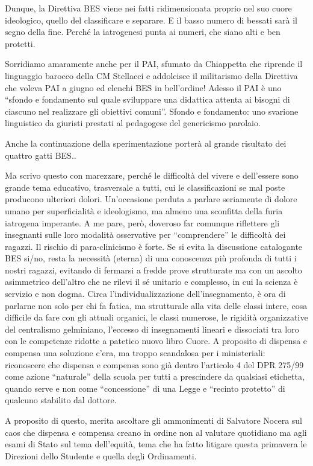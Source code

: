 Dunque, la Direttiva BES viene nei fatti ridimensionata proprio nel suo cuore ideologico, quello del  classificare e separare. E il basso numero di bessati sarà il segno della fine. Perché la iatrogenesi punta ai numeri, che siano alti e ben protetti.  

Sorridiamo amaramente anche per il PAI, sfumato da Chiappetta  che riprende il linguaggio barocco della CM Stellacci  e addolcisce il militarismo della Direttiva che voleva PAI a giugno ed elenchi BES in bell'ordine! Adesso il  PAI è uno   “sfondo e fondamento sul quale sviluppare una didattica attenta ai bisogni di ciascuno nel realizzare gli obiettivi comuni”. Sfondo e fondamento: uno svarione linguistico da giuristi prestati al pedagogese del genericismo parolaio.

Anche la continuazione della sperimentazione porterà al grande risultato dei quattro gatti BES..

Ma scrivo questo con marezzare, perché le difficoltà del vivere e dell'essere sono grande tema educativo, trasversale a tutti, cui le classificazioni se mal poste producono ulteriori dolori. Un'occasione perduta a parlare seriamente di dolore umano per superficialità e ideologismo, ma almeno una sconfitta della furia iatrogena imperante.
A me pare, però, doveroso far comunque riflettere gli insegnanti sulle loro modalità osservative per “comprendere” le difficoltà dei ragazzi. Il rischio di para-clinicismo è forte.  Se si evita la discussione catalogante BES si/no, resta la necessità (eterna) di una conoscenza più profonda di tutti i nostri ragazzi, evitando di fermarsi a fredde prove  strutturate ma con un ascolto asimmetrico dell'altro che ne rilevi il sé unitario e complesso, in cui la scienza è servizio e non dogma.  Circa l'individualizzazione dell'insegnamento, è ora di parlarne non solo per chi fa fatica,  ma strutturale alla vita delle classi intere, cosa  difficile da fare con gli attuali organici, le classi numerose, le rigidità organizzative del centralismo gelminiano, l'eccesso di insegnamenti lineari e dissociati tra loro con le competenze ridotte a patetico nuovo libro Cuore.
A proposito di dispensa e compensa una soluzione c'era, ma troppo scandalosa per i ministeriali: riconoscere che dispensa e compensa sono già dentro l'articolo 4 del DPR 275/99 come azione “naturale” della scuola per tutti a prescindere da qualsiasi etichetta, quando serve e non come “concessione” di una Legge e “recinto protetto” di qualcuno stabilito dal dottore.

A proposito di questo, merita ascoltare gli ammonimenti di Salvatore Nocera sul caos che dispensa e compensa creano in ordine non al valutare quotidiano ma agli esami di Stato sul tema dell'equità, tema che ha fatto litigare questa primavera le Direzioni dello Studente e quella degli Ordinamenti.
